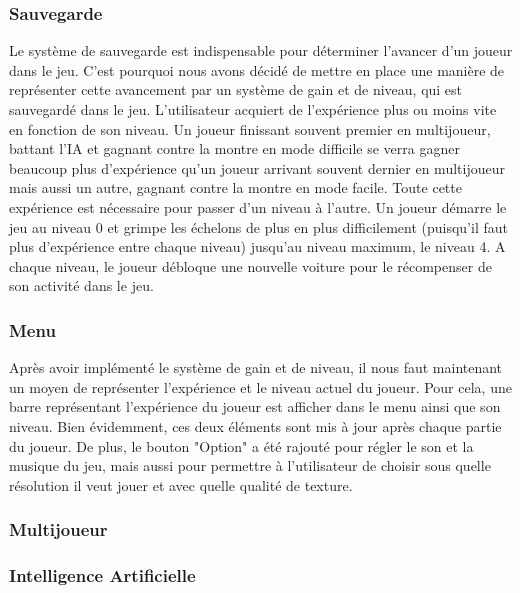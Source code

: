 \documentclass[a4paper,12pt]{article}
\newcommand{\AI}{Intelligence Artificielle}
\begin{document}
            \subsubsection{Sauvegarde}
               Le système de sauvegarde est indispensable pour déterminer l'avancer d'un joueur dans le jeu. C'est 
               pourquoi nous avons décidé de mettre en place une manière de représenter cette avancement par un système 
               de gain et de niveau, qui est sauvegardé dans le jeu. L'utilisateur acquiert de l'expérience plus ou 
               moins vite en fonction de son niveau. Un joueur finissant souvent premier en multijoueur, battant l'IA et
               gagnant contre la montre en mode difficile se verra gagner beaucoup plus d'expérience qu'un joueur 
               arrivant souvent dernier en multijoueur mais aussi un autre, gagnant contre la montre en mode facile. 
               Toute cette expérience est nécessaire pour passer d'un niveau à l'autre. Un joueur démarre le jeu au 
               niveau 0 et grimpe les échelons de plus en plus difficilement (puisqu'il faut plus d'expérience entre 
               chaque niveau) jusqu'au niveau maximum, le niveau 4. A chaque niveau, le joueur débloque une nouvelle 
               voiture pour le récompenser de son activité dans le jeu.
               
            \subsubsection{Menu}
                Après avoir implémenté le système de gain et de niveau, il nous faut maintenant un moyen de représenter
                l'expérience et le niveau actuel du joueur. Pour cela, une barre représentant l'expérience du joueur est
                afficher dans le menu ainsi que son niveau. Bien évidemment, ces deux éléments sont mis à jour après 
                chaque partie du joueur. De plus, le bouton "Option" a été rajouté pour régler le son et la musique du 
                jeu, mais aussi pour permettre à l'utilisateur de choisir sous quelle résolution il veut jouer et avec 
                quelle qualité de texture.  
                
            \subsubsection{Multijoueur}
            \lipsum[33]
            
            \subsubsection{\AI}
            
\end{document}
